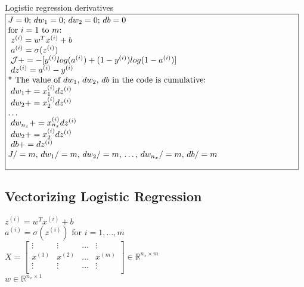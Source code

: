 \documentclass{article}
\begin{document}
Logistic regression derivatives\\

$\noindent\fbox{%
\parbox{\textwidth}{%
$J=0$; $dw_1 = 0$; $dw_2 = 0$; $db=0$\\

for $i=1$ to $m$:\\
$\indent$ $z^{(i)} = w^T x^{(i)} + b$\\
$\indent$ $a^{(i)} = \sigma(z^{(i)})$\\
$\indent$ $\mathcal{J} += -[y^{(i)} log(a^{(i)}) + (1-y^{(i)})log(1-a^{(i)})]$\\
$\indent$ $dz^{(i)} = a^{(i)}- y^{(i)}$\\

* The value of $dw_1$, $dw_2$, $db$ in the code is cumulative:\\
$\indent$ $dw_1 += x_1^{(i)}dz^{(i)}$\\
$\indent$ $dw_2 += x_2^{(i)}dz^{(i)}$\\
$\dots$\\
$\indent$ $dw_{n_x} += x_{n_x}^{(i)}dz^{(i)}$\\

$\indent$ $dw_2 += x_2^{(i)}dz^{(i)}$\\
$\indent$ $db += dz^{(i)}$\\

$J/=m$,  $dw_1 /=m$,  $dw_2 /=m$, \dots, $dw_{n_x} /=m$, $db /=m$\\

    }%
}$\\



\newpage
\subsection{Vectorizing Logistic Regression}

$z^{(i)} = w^T x^{(i)} + b$\\
$a^{(i)} = \sigma(z^{(i)})$ for $i=1, \dots, m$\\

$X =
\begin{bmatrix}
\vdots & \vdots & \dots & \vdots \\
x^{(1)} & x^{(2)} & \dots & x^{(m)}\\
\vdots & \vdots & \dots & \vdots \\
\end{bmatrix} \in \mathbb{R}^{n_x \times m}
$\\

$w \in \mathbb{R}^{n_x \times 1}$\\
\end{document}
